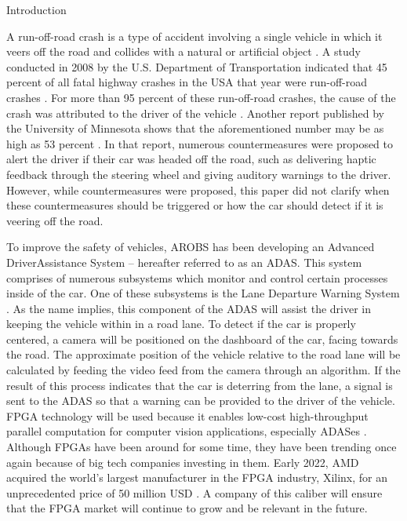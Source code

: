 \documentclass{matthijs}
\begin{document}
	\begin{inhoudspagina}

	\end{inhoudspagina}


	
	\begin{hoofdstuk}{Introduction}

		A run-off-road crash is a type of accident involving a single vehicle in which it veers off the road and collides with a natural or artificial object \cite{liu2009factors}.
		A study conducted in 2008 by the U.S. Department of Transportation indicated that 45 percent of all fatal highway crashes in the USA that year were run-off-road crashes \cite{dod2011run}.
		For more than 95 percent of these run-off-road crashes, the cause of the crash was attributed to the driver of the vehicle \cite{dod2011run}.
		Another report published by the University of Minnesota shows that the aforementioned number may be as high as 53 percent \cite{edwards2013pilot}.
		In that report, numerous countermeasures were proposed to alert the driver if their car was headed off the road, such as delivering haptic feedback through the steering wheel and giving auditory warnings to the driver.
		However, while countermeasures were proposed, this paper did not clarify when these countermeasures should be triggered or how the car should detect if it is veering off the road.
		
		\bigskip

		To improve the safety of vehicles, AROBS has been developing an Advanced Driver\Hyphdash Assistance System -- hereafter referred to as an ADAS.
		This system comprises of numerous subsystems which monitor and control certain processes inside of the car.
		One of these subsystems is the Lane Departure Warning System \cite{el2020novel}.
		As the name implies, this component of the ADAS will assist the driver in keeping the vehicle within in a road lane.
		To detect if the car is properly centered, a camera will be positioned on the dashboard of the car, facing towards the road.
		The approximate position of the vehicle relative to the road lane will be calculated by feeding the video feed from the camera through an algorithm.
		If the result of this process indicates that the car is deterring from the lane, a signal is sent to the ADAS so that a warning can be provided to the driver of the vehicle.
		FPGA technology will be used because it enables low-cost high-throughput parallel computation for computer vision applications, especially ADASes \cite{peri2020how}.
		Although FPGAs have been around for some time, they have been trending once again because of big tech companies investing in them.
		Early 2022, AMD acquired the world's largest \cite{valuates2021field} manufacturer in the FPGA industry, Xilinx, for an unprecedented price of 50 million USD \cite{lee2022amd}.
		A company of this caliber will ensure that the FPGA market will continue to grow and be relevant in the future.
		

\end{hoofdstuk}
\end{document}

